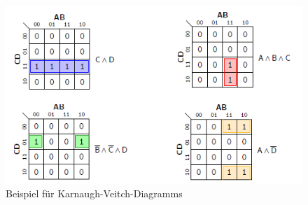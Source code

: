 \documentclass[12pt]{report}
\begin{document}
\begin{figure}[h]
  \caption{Beispiel für Karnaugh-Veitch-Diagramms}
  \centering
  \includegraphics[width=\textwidth]{graphics/karnaugh-veitch-example01}
\end{figure}
\end{document}
